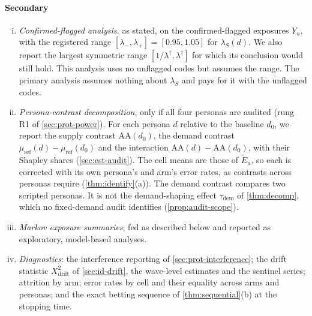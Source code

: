 \paragraph{Secondary}
\begin{enumerate}[(i)]
  \item \emph{Confirmed-flagged analysis.}  as stated, on the confirmed-flagged exposures $Y_u$, with the registered range $[\lambda_-,\lambda_+]=[0.95,1.05]$ for $\lambda_S(d)$. We also report the largest symmetric range $[1/\lambda^\dagger,\lambda^\dagger]$ for which its conclusion would still hold. This analysis uses no unflagged codes but assumes the range. The primary analysis assumes nothing about $\lambda_S$ and pays for it with the unflagged codes.
  \item \emph{Persona-contrast decomposition}, only if all four personas are audited (rung R1 of \cref{sec:prot-power}). For each persona $d$ relative to the baseline $d_0$, we report the supply contrast $\mathrm{AA}(d_0)$, the demand contrast $\mu_{\mathrm{ref}}(d)-\mu_{\mathrm{ref}}(d_0)$ and the interaction $\mathrm{AA}(d)-\mathrm{AA}(d_0)$, with their Shapley shares (\cref{sec:est-audit}). The cell means are those of $\widetilde E_u$, so each is corrected with its own persona's and arm's error rates, as contrasts across personas require (\cref{thm:identify}(a)). The demand contrast compares two scripted personas. It is not the demand-shaping effect $\tau_{\mathrm{dem}}$ of \cref{thm:decomp}, which no fixed-demand audit identifies (\cref{prop:audit-scope}).
  \item \emph{Markov exposure summaries}, fed as described below and reported as exploratory, model-based analyses.

  \item \emph{Diagnostics}: the interference reporting of \cref{sec:prot-interference}; the drift statistic $X^2_{\mathrm{drift}}$ of \cref{sec:id-drift}, the wave-level estimates and the sentinel series; attrition by arm; error rates by cell and their equality across arms and personas; and the exact betting sequence of \cref{thm:sequential}(b) at the stopping time.
\end{enumerate}


